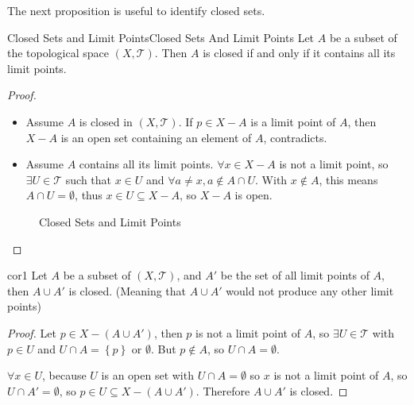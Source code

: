\documentclass[../main.tex]{subfiles}
\begin{document}
The next proposition is useful to identify closed sets.
\begin{theorem}{Closed Sets and Limit Points}{Closed Sets And Limit Points}
	Let $A$ be a subset of the topological space $(X,\mathcal{T})$. Then $A$ is closed if and only if it contains all its limit points.
\end{theorem}
\begin{proof}
\begin{itemize}
\item Assume $A$ is closed in $(X,\mathcal{T})$. If $p\in X-A$ is a limit point of $A$, then $X-A$ is an open set containing an element of $A$, contradicts.
\item Assume $A$ contains all its limit points. $\forall x\in X-A$ is not a limit point, so $\exists U\in \mathcal{T}$ such that $x\in U$ and $\forall a\neq x, a\notin A\cap U$. With $x\notin A$, this means $A\cap U = \emptyset $, thus $x\in U \subseteq X-A$, so $X-A$ is open.
\end{itemize}
\begin{figure}[ht]
    \centering
    \caption{Closed Sets and Limit Points}
    \label{fig:closed-sets-and-limit-points}
\end{figure}
\end{proof}
\begin{corollary}{}{cor1}
Let $A$ be a subset of $(X,\mathcal{T})$, and $A'$ be the set of all limit points of $A$, then $A\cup A'$ is closed. (Meaning that $A\cup A'$ would not produce any other limit points)
\end{corollary}
\begin{proof}
Let $p\in X-(A\cup A')$, then $p$ is not a limit point of $A$, so $\exists U\in \mathcal{T}$ with $p\in U$ and $U\cap A = \left\{ p \right\}\text{ or }\emptyset $. But $p\notin A$, so $U\cap A = \emptyset$. 

$\forall x\in U$, because $U$ is an open set with $U\cap A = \emptyset $ so $x$ is not a limit point of $A$, so $U\cap A' = \emptyset $, so $p\in U \subseteq X - (A\cup A')$. Therefore $A\cup A'$ is closed.
\end{proof}
\end{document}
